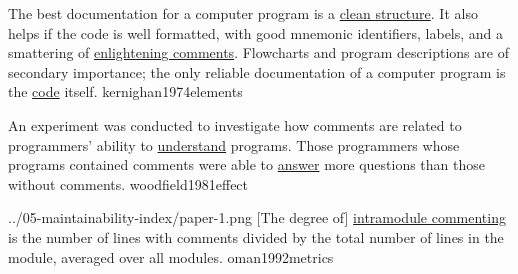 \documentclass{article}
\begin{document}

  {The best documentation for a computer program is a \ul{clean structure}. It also helps if the code is well formatted, with good mnemonic identifiers, labels, and a smattering of \ul{enlightening comments}. Flowcharts and program descriptions are of secondary importance; the only reliable documentation of a computer program is the \ul{code} itself.}
  {kernighan1974elements}


  {An experiment was conducted to investigate how comments are related to programmers' ability to \ul{understand} programs. Those programmers whose programs contained comments were able to \ul{answer} more questions than those without comments.}
  {woodfield1981effect}

\qte
  {../05-maintainability-index/paper-1.png}
  {[The degree of] \ul{intramodule commenting} is the number of lines with comments divided by the total number of lines in the module, averaged over all modules.}
  {oman1992metrics}
\end{document}
